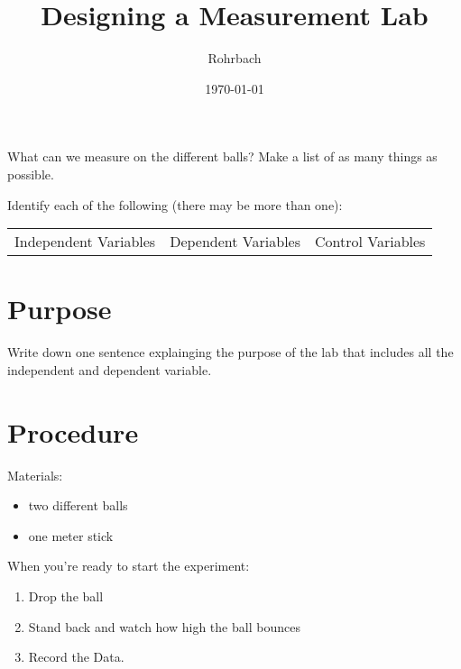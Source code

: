 \documentclass[10pt]{exam}
\title{Designing a Measurement Lab}
\author{Rohrbach}
\date{\today}
\begin{document}
\maketitle

\vspace{-2em}
\begin{questions}
  
    \question
      What can we measure on the different balls?  Make 
      a list of as many things as possible. 
      \vs[3]

    \question
      Identify each of the following (there may be more 
      than one):
      
      \begin{center}
        \begin{tabular}
          { m{} | m{}| m{} } 
          Independent Variables & 
          Dependent Variables   & 
          Control Variables  \\[8em]
        \end{tabular}
      \end{center}
    
  
\end{questions}

\section*{Purpose}
Write down one sentence explainging the purpose of the lab that includes all the independent and dependent variable.
\vs

\section*{Procedure}

Materials:

\begin{itemize}
  \item two different balls
  \item one meter stick
\end{itemize}


\noindent When you're ready to start the experiment:

\begin{enumerate}
  \item Drop the ball
  \item Stand back and watch how high the ball bounces
  \item Record the Data.
\end{enumerate}
\end{document}
